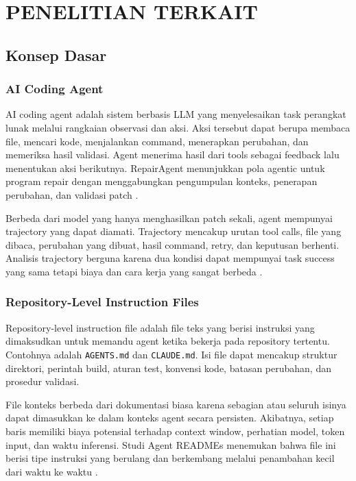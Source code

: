 \chapter{PENELITIAN TERKAIT}

\section{Konsep Dasar}

\subsection{AI Coding Agent}

AI coding agent adalah sistem berbasis LLM yang menyelesaikan task perangkat lunak melalui rangkaian observasi dan aksi. Aksi tersebut dapat berupa membaca file, mencari kode, menjalankan command, menerapkan perubahan, dan memeriksa hasil validasi. Agent menerima hasil dari tools sebagai feedback lalu menentukan aksi berikutnya. RepairAgent menunjukkan pola agentic untuk program repair dengan menggabungkan pengumpulan konteks, penerapan perubahan, dan validasi patch \cite{repairagent2025}.

Berbeda dari model yang hanya menghasilkan patch sekali, agent mempunyai trajectory yang dapat diamati. Trajectory mencakup urutan tool calls, file yang dibaca, perubahan yang dibuat, hasil command, retry, dan keputusan berhenti. Analisis trajectory berguna karena dua kondisi dapat mempunyai task success yang sama tetapi biaya dan cara kerja yang sangat berbeda \cite{bouzenia2025trajectories}.

\subsection{Repository-Level Instruction Files}

Repository-level instruction file adalah file teks yang berisi instruksi yang dimaksudkan untuk memandu agent ketika bekerja pada repository tertentu. Contohnya adalah \texttt{AGENTS.md} dan \texttt{CLAUDE.md}. Isi file dapat mencakup struktur direktori, perintah build, aturan test, konvensi kode, batasan perubahan, dan prosedur validasi.

File konteks berbeda dari dokumentasi biasa karena sebagian atau seluruh isinya dapat dimasukkan ke dalam konteks agent secara persisten. Akibatnya, setiap baris memiliki biaya potensial terhadap context window, perhatian model, token input, dan waktu inferensi. Studi Agent READMEs menemukan bahwa file ini berisi tipe instruksi yang berulang dan berkembang melalui penambahan kecil dari waktu ke waktu \cite{agentreadmes2025}.

